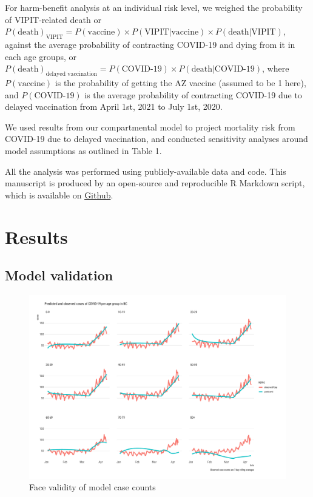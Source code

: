 \documentclass[]{elsarticle} %
\begin{document}
For harm-benefit analysis at an individual risk level, we weighed the
probability of VIPIT-related death or
\(P(\text{death})_{\text{VIPIT}} = P(\text{vaccine}) \times P(\text{VIPIT}|\text{vaccine}) \times P(\text{death}|\text{VIPIT})\),
against the average probability of contracting COVID-19 and dying from
it in each age groups, or
\(P(\text{death})_{\text{delayed vaccination}} = P(\text{COVID-19}) \times P(\text{death}|\text{COVID-19})\),
where \(P(\text{vaccine})\) is the probability of getting the AZ vaccine
(assumed to be 1 here), and \(P(\text{COVID-19})\) is the average
probability of contracting COVID-19 due to delayed vaccination from
April 1st, 2021 to July 1st, 2020.

We used results from our compartmental model to project mortality risk
from COVID-19 due to delayed vaccination, and conducted sensitivity
analyses around model assumptions as outlined in Table 1.

All the analysis was performed using publicly-available data and code.
This manuscript is produced by an open-source and reproducible R
Markdown script, which is available on
\href{https://github.com/aminadibi/astrazenecaVIPIT}{Github}.

\hypertarget{results}{%
\section{Results}\label{results}}

\hypertarget{model-validation}{%
\subsection{Model validation}\label{model-validation}}

\begin{figure}

{\centering \includegraphics[width=1\linewidth]{../figures/fig-validation} 

}

\caption{Face validity of model case counts}\label{fig:figValidation}
\end{figure}
\end{document}
